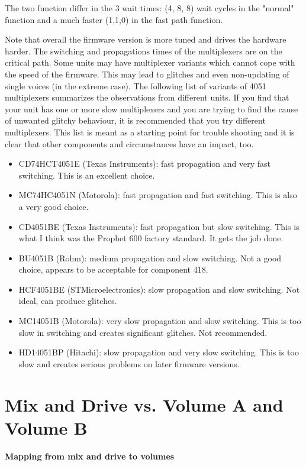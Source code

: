 \documentclass[portrait, 11pt, oneside]{report}
\begin{document}
The two function differ in the 3 wait times: (4, 8, 8) wait cycles in the "normal" function and a much faster (1,1,0) in the fast path function.

Note that overall the firmware version \version is more tuned and drives the hardware harder. The switching and propagations times of the multiplexers are on the critical path. Some units may have multiplexer variants which cannot cope with the speed of the firmware. This may lead to glitches and even non-updating of single voices (in the extreme case). The following list of variants of 4051 multiplexers summarizes the observations from different units. If you find that your unit has one or more slow multiplexers and you are trying to find the cause of unwanted glitchy behaviour, it is recommended that you try different multiplexers. This list is meant as a starting point for trouble shooting and it is clear that other components and circumstances have an impact, too.

\begin{itemize}
  \item CD74HCT4051E (Texas Instruments): fast propagation and very fast switching. This is an excellent choice. 
  \item MC74HC4051N (Motorola): fast propagation and fast switching. This is also a very good choice.
  \item CD4051BE (Texas Instruments): fast propagation but slow switching. This is what I think was the Prophet 600 factory standard. It gets the job done.  
  \item BU4051B (Rohm): medium propagation and slow switching. Not a good choice, appears to be acceptable for component 418.
  \item HCF4051BE (STMicroelectronics): slow propagation and slow switching. Not ideal, can produce glitches.
  \item MC14051B (Motorola): very slow propagation and slow switching. This is too slow in switching and creates significant glitches. Not recommended.
  \item HD14051BP (Hitachi): slow propagation and very slow switching. This is too slow and creates serious problems on later firmware versions.
\end{itemize}


\section{Mix and Drive vs. Volume A and Volume B}

\textbf{Mapping from mix and drive to volumes} 
\end{document}
